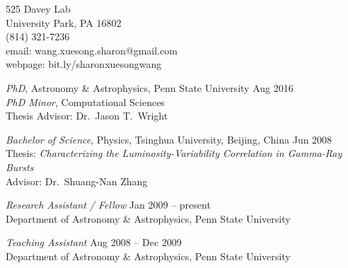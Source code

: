 

\begin{small}

\begin{center}
525 Davey Lab\\
University Park, PA 16802\\
(814) 321-7236\\
email: wang.xuesong.sharon@gmail.com\\
webpage: bit.ly/sharonxuesongwang\\

\end{center}
\smallskip




{\sl PhD}, Astronomy \& Astrophysics, Penn State University
\hfill Aug 2016 \\
{\sl PhD Minor}, Computational Sciences\\
Thesis Advisor: Dr.\ Jason T.\ Wright
\vspace{10pt}

{\sl Bachelor of Science}, Physics, Tsinghua University, Beijing,
China \hfill Jun 2008 \\
Thesis: \textit{Characterizing the Luminosity-Variability Correlation
  in Gamma-Ray Bursts}\\
Advisor: Dr.\ Shuang-Nan Zhang






{\sl Research Assistant / Fellow} \hfill        Jan 2009 -- present  \\
Department of Astronomy \& Astrophysics, Penn State University

\vspace{10pt}   
   
{\sl Teaching Assistant} \hfill       Aug 2008 -- Dec 2009 \\
Department of Astronomy \& Astrophysics, Penn State University
   





\end{small}
